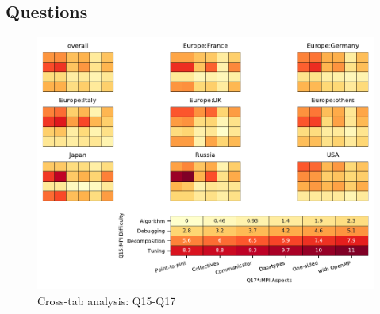 
\subsection{Questions}


\begin{figure}
\begin{center}
\includegraphics[width=12cm]{../pdfs/Q15-Q17.pdf}
\caption{Cross-tab analysis: Q15-Q17}
\label{fig:Q15-Q17}
\end{center}
\end{figure}
